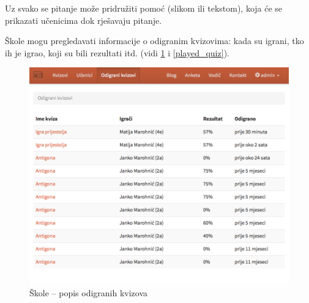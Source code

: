 \documentclass{scrreprt}
\begin{document}
Uz svako se pitanje može pridružiti pomoć (slikom ili tekstom), koja će se
prikazati učenicima dok rješavaju pitanje.

Škole mogu pregledavati informacije o odigranim kvizovima: kada su igrani, tko
ih je igrao, koji su bili rezultati itd. (vidi \ref{played_quizzes} i \ref{played_quiz}).

\begin{figure}[H]
  \includegraphics[width=\textwidth, clip=true, trim=0 10cm 0 0, fbox]{school/played_quizzes}
  \caption{Škole -- popis odigranih kvizova}
  \label{played_quizzes}
\end{figure}
\end{document}
